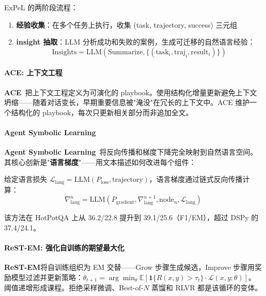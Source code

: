 ExPeL 的两阶段流程：
\begin{enumerate}
\item \textbf{经验收集}：在多个任务上执行，收集 (task, trajectory, success) 三元组
\item \textbf{insight 抽取}：LLM 分析成功和失败的案例，生成可迁移的自然语言经验：
\begin{equation}
\text{Insights} = \text{LLM}(\text{Summarize}, \{(\text{task}_i, \text{traj}_i, \text{result}_i)\})
\label{eq:expel-insights}
\end{equation}
\end{enumerate}

\paragraph{ACE: 上下文工程}

\textbf{ACE}~\citep{ace2024}把上下文工程定义为可演化的 playbook。使用结构化增量更新避免上下文坍缩——随着对话变长，早期重要信息被"淹没"在冗长的上下文中。ACE 维护一个结构化的 playbook，每次只更新相关部分而非追加全文。

\paragraph{Agent Symbolic Learning}

\textbf{Agent Symbolic Learning}~\citep{agentsymboliclearning2024}将反向传播和梯度下降完全映射到自然语言空间。其核心创新是"\textbf{语言梯度}"——用文本描述如何改进每个组件：

\begin{definition}[语言梯度]
给定语言损失 $\mathcal{L}_{\mathrm{lang}} = \mathrm{LLM}(P_{\mathrm{loss}}, \text{trajectory})$，语言梯度通过链式反向传播计算：
\begin{equation}
\nabla_{\mathrm{lang}}^n = \mathrm{LLM}(P_{\mathrm{gradient}}, \nabla_{\mathrm{lang}}^{n+1}, \text{node}_n, \mathcal{L}_{\mathrm{lang}})
\label{eq:lang-gradient}
\end{equation}
\end{definition}

该方法在 HotPotQA 上从 36.2/22.8 提升到 39.1/25.6（F1/EM），超过 DSPy 的 37.4/24.1。

\paragraph{ReST-EM: 强化自训练的期望最大化}

\textbf{ReST-EM}将自训练组织为 EM 交替——Grow 步骤生成候选，Improve 步骤用奖励模型过滤并更新策略：$\theta_{t+1} = \arg\min_\theta \mathbb{E}[\mathbf{1}\{R(x,y)>\tau_t\} \cdot \mathcal{L}(x,y;\theta)]$。阈值递增形成课程。拒绝采样微调、Best-of-$N$ 蒸馏和 RLVR 都是该循环的变体。


